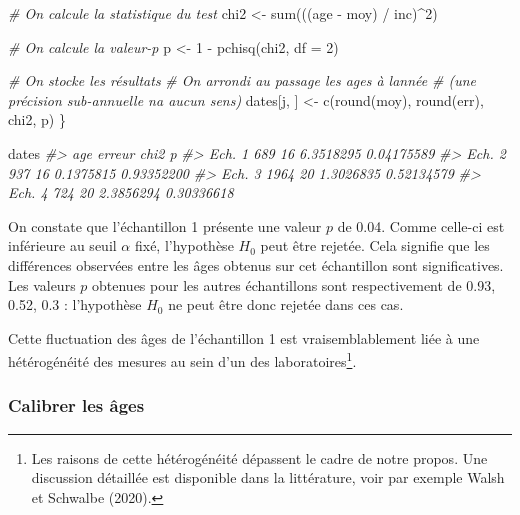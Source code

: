 \documentclass[
  french,
]{scrbook}
\newenvironment{Shaded}{\begin{snugshade}}{\end{snugshade}}
\newcommand{\AttributeTok}[1]{\textcolor[rgb]{0.77,0.63,0.00}{#1}}
\newcommand{\CommentTok}[1]{\textcolor[rgb]{0.56,0.35,0.01}{\textit{#1}}}
\newcommand{\DecValTok}[1]{\textcolor[rgb]{0.00,0.00,0.81}{#1}}
\newcommand{\FunctionTok}[1]{\textcolor[rgb]{0.00,0.00,0.00}{#1}}
\newcommand{\NormalTok}[1]{#1}
\newcommand{\OtherTok}[1]{\textcolor[rgb]{0.56,0.35,0.01}{#1}}
\newcommand{\SpecialCharTok}[1]{\textcolor[rgb]{0.00,0.00,0.00}{#1}}
\begin{document}
\begin{Shaded}
\begin{Highlighting}[]
  \CommentTok{\# On calcule la statistique du test}
\NormalTok{  chi2 }\OtherTok{\textless{}{-}} \FunctionTok{sum}\NormalTok{(((age }\SpecialCharTok{{-}}\NormalTok{ moy) }\SpecialCharTok{/}\NormalTok{ inc)}\SpecialCharTok{\^{}}\DecValTok{2}\NormalTok{)}

  \CommentTok{\# On calcule la valeur{-}p}
\NormalTok{  p }\OtherTok{\textless{}{-}} \DecValTok{1} \SpecialCharTok{{-}} \FunctionTok{pchisq}\NormalTok{(chi2, }\AttributeTok{df =} \DecValTok{2}\NormalTok{)}

  \CommentTok{\# On stocke les résultats}
  \CommentTok{\# On arrondi au passage les ages à l\textquotesingle{}année}
  \CommentTok{\# (une précision sub{-}annuelle n\textquotesingle{}a aucun sens)}
\NormalTok{  dates[j, ] }\OtherTok{\textless{}{-}} \FunctionTok{c}\NormalTok{(}\FunctionTok{round}\NormalTok{(moy), }\FunctionTok{round}\NormalTok{(err), chi2, p)}
\NormalTok{\}}

\NormalTok{dates}
\CommentTok{\#\textgreater{}         age erreur      chi2          p}
\CommentTok{\#\textgreater{} Ech. 1  689     16 6.3518295 0.04175589}
\CommentTok{\#\textgreater{} Ech. 2  937     16 0.1375815 0.93352200}
\CommentTok{\#\textgreater{} Ech. 3 1964     20 1.3026835 0.52134579}
\CommentTok{\#\textgreater{} Ech. 4  724     20 2.3856294 0.30336618}
\end{Highlighting}
\end{Shaded}

On constate que l'échantillon 1 présente une valeur \(p\) de 0.04. Comme celle-ci est inférieure au seuil \(\alpha\) fixé, l'hypothèse \(H_0\) peut être rejetée. Cela signifie que les différences observées entre les âges obtenus sur cet échantillon sont significatives. Les valeurs \(p\) obtenues pour les autres échantillons sont respectivement de 0.93, 0.52, 0.3 : l'hypothèse \(H_0\) ne peut être donc rejetée dans ces cas.

Cette fluctuation des âges de l'échantillon 1 est vraisemblablement liée à une hétérogénéité des mesures au sein d'un des laboratoires\footnote{Les raisons de cette hétérogénéité dépassent le cadre de notre propos. Une discussion détaillée est disponible dans la littérature, voir par exemple Walsh et Schwalbe (2020).}.

\hypertarget{calibrer-les-uxe2ges}{%
\subsubsection{Calibrer les âges}\label{calibrer-les-uxe2ges}}
\end{document}

